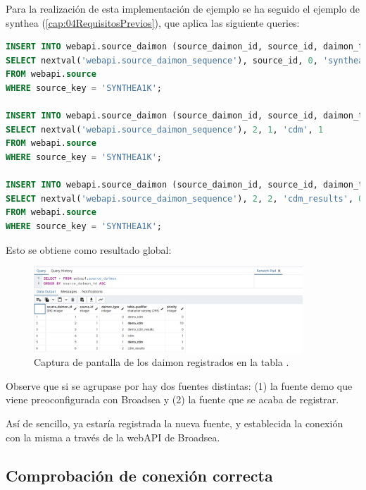 \begin{enumerate}
    Para la realización de esta implementación de ejemplo se ha seguido el ejemplo de synthea (\ref{cap:04RequisitosPrevios}), que aplica las siguiente queries:

\begin{lstlisting}[language=sql]
INSERT INTO webapi.source_daimon (source_daimon_id, source_id, daimon_type, table_qualifier, priority) 
SELECT nextval('webapi.source_daimon_sequence'), source_id, 0, 'synthea', 0
FROM webapi.source
WHERE source_key = 'SYNTHEA1K';

INSERT INTO webapi.source_daimon (source_daimon_id, source_id, daimon_type, table_qualifier, priority) 
SELECT nextval('webapi.source_daimon_sequence'), 2, 1, 'cdm', 1
FROM webapi.source
WHERE source_key = 'SYNTHEA1K';

INSERT INTO webapi.source_daimon (source_daimon_id, source_id, daimon_type, table_qualifier, priority) 
SELECT nextval('webapi.source_daimon_sequence'), 2, 2, 'cdm_results', 0
FROM webapi.source
WHERE source_key = 'SYNTHEA1K';
\end{lstlisting}

    Esto se obtiene como resultado global:

\begin{figure}[H]
    \centering
    \includegraphics[width=0.90\textwidth]{figures/queryDaimon.png}
    \caption{Captura de pantalla de los daimon registrados en la tabla .}
    \label{fig:queryDaimon}
\end{figure}

    Observe que si se agrupase por  hay dos fuentes distintas: (1) la fuente demo que viene preoconfigurada con Broadsea y (2) la fuente que se acaba de registrar.

\end{enumerate}

Así de sencillo, ya estaría registrada la nueva fuente, y establecida la conexión con la misma a través de la webAPI de Broadsea.

\subsection{Comprobación de conexión correcta}

